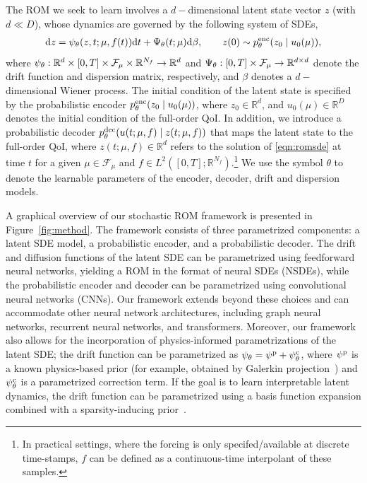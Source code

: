 \documentclass{article}
\begin{document}
	The ROM we seek to learn involves a $d-$dimensional latent state vector $z$ (with $d \ll D$), whose dynamics are governed by the following system of SDEs,
	\begin{equation} \label{eqn:romsde}
		\begin{aligned}
			\text{d}z = \psi_{\theta} (z, t; \mu, f(t)) 
			\text{d}t + 
			\Psi_{\theta}(t; \mu) \text{d}\beta,\qquad
			z(0) \sim p_\theta^{\rm enc} (z_0 \;|\;u_0(\mu)),
		\end{aligned}
	\end{equation}
	where $\psi_\theta: \mathbb{R}^{d} \times [0, T]  \times  \mathcal{F}_{\mu} \times \mathbb{R}^{N_f} \rightarrow \mathbb{R}^{d}$ and $\Psi_\theta: [0, T] \times \mathcal{F}_\mu \rightarrow \mathbb{R}^{d\times d}$ denote the drift function and dispersion matrix, respectively, and $\beta$ denotes a $d-$dimensional Wiener process. The initial condition of the latent state is specified by the probabilistic encoder $p_\theta^{\rm enc} (z_0 \;|\;u_0(\mu))$, where $z_0 \in \mathbb{R}^d$, and $u_0(\mu) \in \mathbb{R}^D$ denotes the initial condition of the full-order QoI. In addition, we introduce a probabilistic decoder $p_\theta^{\rm dec} (u(t; \mu, f) \;|\; z(t; \mu, f))$ that maps the latent state to the full-order QoI, where  $z(t;\mu,f) \in \mathbb{R}^d$ refers to the solution of \eqref{eqn:romsde} at time $t$ for a given $\mu \in \mathcal{F}_\mu$ and $f \in L^2( [0,T]; \mathbb{R}^{N_f})$.\footnote{In practical settings, where the forcing is only specifed/available at discrete time-stamps, $f$ can be defined as a continuous-time interpolant of these samples.} We use the symbol $\theta$ to denote the learnable parameters of the  encoder, decoder, drift and dispersion models.
	
	A graphical overview of our stochastic ROM framework is presented in Figure~\ref{fig:method}. The framework consists of three parametrized components: a latent SDE model, a probabilistic encoder, and a probabilistic decoder. The drift and diffusion functions of the latent SDE can be parametrized using feedforward neural networks, yielding a ROM in the format of neural SDEs (NSDEs), while the probabilistic encoder and decoder can be parametrized using convolutional neural networks (CNNs). Our framework extends beyond these choices and can accommodate other neural network architectures, including graph neural networks, recurrent neural networks, and transformers. Moreover, our framework also allows for the incorporation of physics-informed parametrizations of the latent SDE; the drift function can be parametrized as $\psi_\theta = \psi^{\rm p} + \psi^{\rm c}_\theta$, where $\psi^{\rm p}$ is a known physics-based prior (for example, obtained by Galerkin projection~\cite{LeeCarlberg2020}) and $\psi^{\rm c}_\theta$ is a parametrized correction term. If the goal is to learn interpretable latent dynamics, the drift function can be parametrized using a basis function expansion combined with a sparsity-inducing prior~\cite{Course_2023_State_Estimation}.
	
\end{document}
